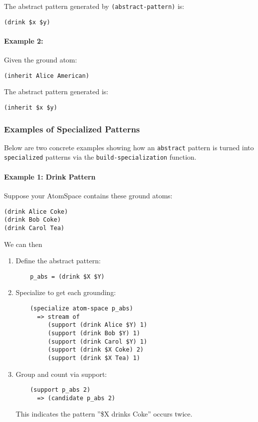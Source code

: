 \documentclass{article}
\begin{document}
The abstract pattern generated by \texttt{(abstract-pattern)} is:

\begin{verbatim}
(drink $x $y)
\end{verbatim}

\paragraph{Example 2:}

Given the ground atom:

\begin{verbatim}
(inherit Alice American)
\end{verbatim}

The abstract pattern generated is:

\begin{verbatim}
(inherit $x $y)
\end{verbatim}


\subsubsection{Examples of Specialized Patterns}

Below are two concrete examples showing how an \texttt{abstract} pattern is turned into \texttt{specialized} patterns via the \texttt{build-specialization} function.

\paragraph{Example 1: Drink Pattern}

Suppose your AtomSpace contains these ground atoms:
\begin{verbatim}
(drink Alice Coke)
(drink Bob Coke)
(drink Carol Tea)
\end{verbatim}

We can then

\begin{enumerate}
\item  Define the abstract pattern:
    \begin{verbatim}
    p_abs = (drink $X $Y)
    \end{verbatim}

\item  Specialize to get each grounding:
    \begin{verbatim}
    (specialize atom-space p_abs)
      => stream of
         (support (drink Alice $Y) 1)
         (support (drink Bob $Y) 1)
         (support (drink Carol $Y) 1)
         (support (drink $X Coke) 2)
         (support (drink $X Tea) 1)
    \end{verbatim}

\item   Group and count via support:
    \begin{verbatim}
    (support p_abs 2)
      => (candidate p_abs 2)
    \end{verbatim}
    This indicates the pattern ''\$X drinks Coke'' occurs twice.
\end{enumerate}
\end{document}
